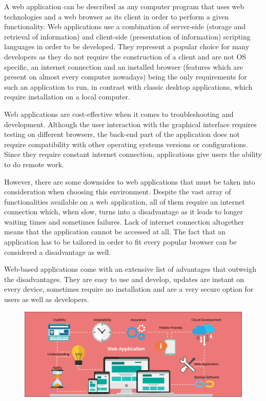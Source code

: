 \documentclass{report}
\begin{document}
A web application can be described as any computer program that uses web technologies and a web browser as its client in order to perform a given functionality. Web applications use a combination of server-side (storage and retrieval of information) and client-side (presentation of information) scripting languages in order to be developed. They represent a popular choice for many developers as they do not require the construction of a client and are not OS specific, an internet connection and an installed browser (features which are present on almost every computer nowadays) being the only requirements for such an application to run, in contrast with classic desktop applications, which require installation on a local computer. \par 

Web applications are cost-effective when it comes to troubleshooting and development. Although the user interaction with the graphical interface requires testing on different browsers, the back-end part of the application does not require compatibility with other operating systems versions or configurations. Since they require constant internet connection, applications give users the ability to do remote work. \par

However, there are some downsides to web applications that must be taken into consideration when choosing this environment. Despite the vast array of functionalities available on a web application, all of them require an internet connection which, when slow, turns into a disadvantage as it leads to longer waiting times and sometimes failures. Lack of internet connection altogether means that the application cannot be accessed at all. The fact that an application has to be tailored in order to fit every popular browser can be considered a disadvantage as well. \par

Web-based applications come with an extensive list of advantages that outweigh the disadvantages. They are easy to use and develop, updates are instant on every device, sometimes require no installation and are a very secure option for users as well as developers. \par

\begin{figure}[b]
\centerline{\includegraphics[scale=0.1]{webapp}}
\end{figure}
\end{document}
